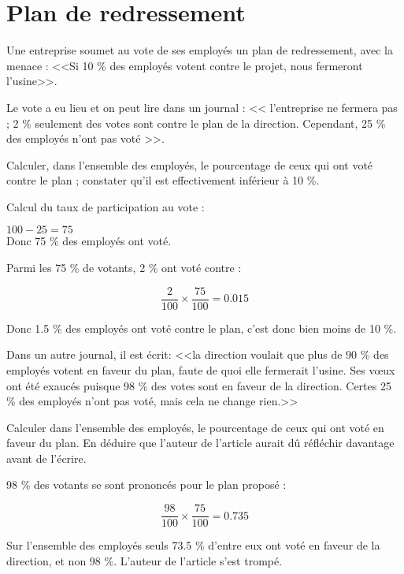 \section{Plan de redressement}

Une entreprise soumet au vote de ses employés un plan de redressement, avec la menace : <<Si 10 \% des employés votent contre le projet, nous fermeront l'usine>>.

Le vote a eu lieu et on peut lire dans un journal : << l'entreprise ne fermera pas ; 2 \% seulement des votes sont contre le plan de la direction. Cependant, 25 \% des employés n'ont pas voté >>.

\begin{questions}
	\question Calculer, dans l'ensemble des employés, le pourcentage de ceux qui ont voté contre le plan ; constater qu'il est effectivement inférieur à 10 \%.
	
	\begin{solution}
		Calcul du taux de participation au vote :
		
		$100 - 25 = 75 $ \\
		Donc 75 \% des employés ont voté.
		
		Parmi les 75 \% de votants, 2 \% ont voté contre :
		
		\begin{equation*}
			\frac{2}{100} \times \dfrac{75}{100} = \num{0.015}
		\end{equation*}
		
		Donc \num{1.5} \% des employés ont voté contre le plan, c'est donc bien moins de 10 \%. 
		
	\end{solution}
	
	\question Dans un autre journal, il est écrit: <<la direction voulait que plus de 90 \% des employés votent en faveur du plan, faute de quoi elle fermerait l'usine. Ses v\oe ux ont été exaucés puisque 98 \% des votes sont en faveur de la direction. Certes 25 \% des employés n'ont pas voté, mais cela ne change rien.>>
	
	Calculer dans l'ensemble des employés, le pourcentage de ceux qui ont voté en faveur du plan. En déduire que l'auteur de l'article aurait dû réfléchir davantage avant de l'écrire.  
	
		\begin{solution}
			98 \% des votants se sont prononcés pour le plan proposé :
			
			\begin{equation*}
				\frac{98}{100} \times \dfrac{75}{100} = \num{0.735}
			\end{equation*}
			
			Sur l'ensemble des employés seuls \num{73.5} \% d'entre eux ont voté en faveur de la direction, et non 98 \%. L'auteur de l'article s'est trompé.
		\end{solution}
	
	
\end{questions} 